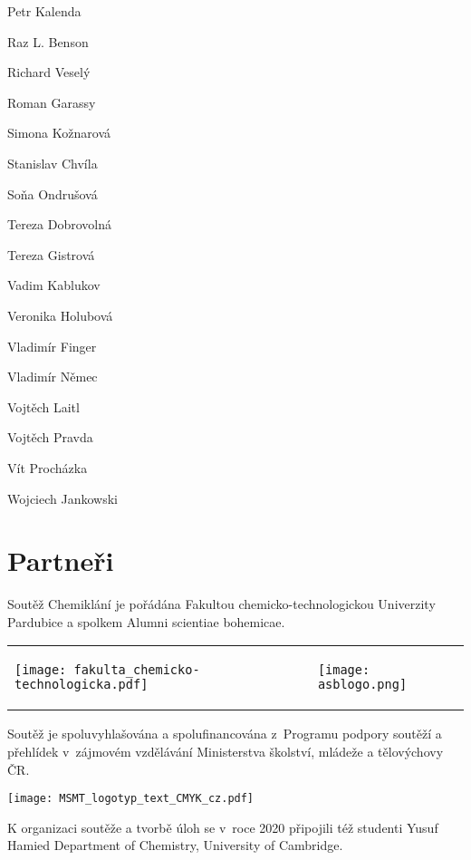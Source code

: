 \documentclass{book}
\begin{document}
\begin{multicols}{3}
Petr Kalenda

Raz L. Benson

Richard Veselý

Roman Garassy

Simona Kožnarová

Stanislav Chvíla

Soňa Ondrušová

Tereza Dobrovolná

Tereza Gistrová

Vadim Kablukov

Veronika Holubová

Vladimír Finger

Vladimír Němec

Vojtěch Laitl

Vojtěch Pravda

Vít Procházka

Wojciech Jankowski

\vfill

\end{multicols}
\clearpage
\thispagestyle{empty}
\section*{Partneři}

Soutěž Chemiklání je pořádána Fakultou chemicko-technologickou Univerzity Pardubice a spolkem Alumni scientiae bohemicae.

\begin{center}
\begin{tabular}{ m{8cm} m{8cm} }
 \begin{center} \texttt{[image: fakulta\_chemicko-technologicka.pdf]} \end{center}  & \begin{center}  \texttt{[image: asblogo.png]} \end{center}
\end{tabular}
\end{center}

Soutěž je spoluvyhlašována a spolufinancována z~Programu podpory soutěží a přehlídek v~zájmovém vzdělávání Ministerstva školství, mládeže a tělovýchovy ČR.

\begin{center}
\texttt{[image: MSMT\_logotyp\_text\_CMYK\_cz.pdf]}    
\end{center}

K organizaci soutěže a tvorbě úloh se v~roce 2020 připojili též studenti Yusuf Hamied Department of Chemistry, University of Cambridge.
\end{document}
